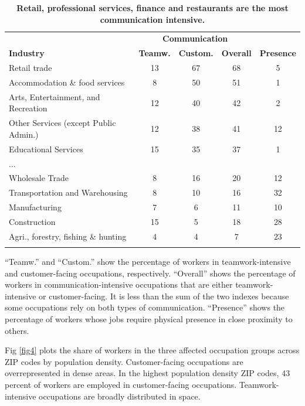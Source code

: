 \begin{table}[!ht]
\caption{
{\bf Retail, professional services, finance and restaurants are the most communication intensive.}}
\begin{tabular}{|l|c|c|c|c|}
\hline
 & \multicolumn{3}{c}{\bf Communication} &  
\\ 
{\bf Industry} & {\bf Teamw.} & {\bf Custom.} & {\bf Overall} & {\bf Presence} 
\\ \thickhline
Retail trade &13&67&68&5\\
Accommodation \& food services &8&50&51&1\\
Arts, Entertainment, and Recreation &12&40&42&2\\
Other Services (except Public Admin.) &12&38&41&12\\
Educational Services &15&35&37&1\\
...&&&&\\
Wholesale Trade &8&16&20&12\\
Transportation and Warehousing  &8&10&16&32\\
Manufacturing &7&6&11&10\\
Construction &15&5&18&28\\
Agri., forestry, fishing \& hunting &4&4&7&23\\
 \thickhline

\hline
\end{tabular}
\begin{flushleft} ``Teamw.'' and ``Custom.'' show the percentage of workers in teamwork-intensive and customer-facing occupations, respectively. ``Overall'' shows the percentage of workers in communication-intensive occupations that are either teamwork-intensive or customer-facing. It is less than the sum of the two indexes because some occupations rely on both types of communication. ``Presence'' shows the percentage of workers whose jobs require physical presence in close proximity to others.
\end{flushleft}
\label{table2}
\end{table}

Fig \ref{fig4} plots the share of workers in the three affected occupation groups across ZIP codes by population density. Customer-facing occupations are overrepresented in dense areas. In the highest population density ZIP codes, 43 percent of workers are employed in customer-facing occupations. Teamwork-intensive occupations are broadly distributed in space.

